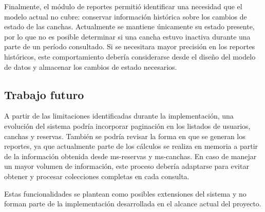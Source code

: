 Finalmente, el módulo de reportes permitió identificar una necesidad que el
modelo actual no cubre: conservar información histórica sobre los cambios de
estado de las canchas. Actualmente se mantiene únicamente su estado presente,
por lo que no es posible determinar si una cancha estuvo inactiva durante una
parte de un período consultado. Si se necesitara mayor precisión en los
reportes históricos, este comportamiento debería considerarse desde el diseño
del modelo de datos y almacenar los cambios de estado necesarios.

\subsection{Trabajo futuro}
\label{sec:trabajo-futuro}

A partir de las limitaciones identificadas durante la implementación, una
evolución del sistema podría incorporar paginación en los listados de usuarios,
canchas y reservas. También se podría revisar la forma en que se generan los
reportes, ya que actualmente parte de los cálculos se realiza en memoria a partir
de la información obtenida desde ms-reservas y ms-canchas. En caso de manejar un
mayor volumen de información, este proceso debería adaptarse para evitar obtener
y procesar colecciones completas en cada consulta.

Estas funcionalidades se plantean como posibles extensiones del sistema y no
forman parte de la implementación desarrollada en el alcance actual del proyecto.

